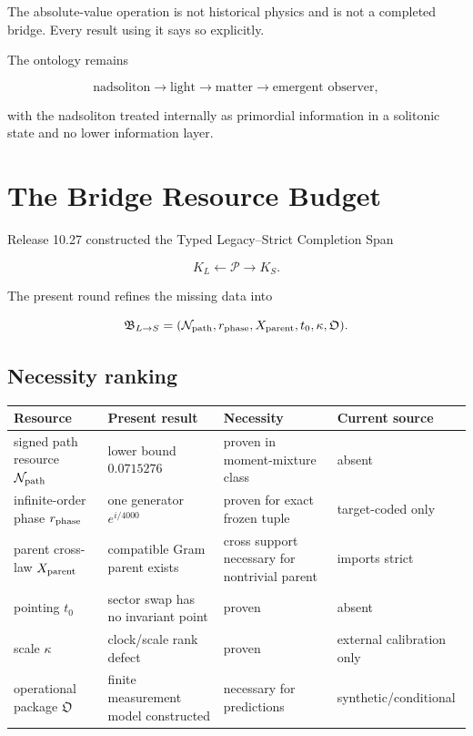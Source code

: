 \documentclass[11pt,a4paper,openany]{report}
\begin{document}
The absolute-value operation is not historical physics and is not a completed bridge. Every result using it says so explicitly.

The ontology remains

\[
\text{nadsoliton}
\to
\text{light}
\to
\text{matter}
\to
\text{emergent observer},
\]

with the nadsoliton treated internally as primordial information in a solitonic state and no lower information layer.

\chapter{The Bridge Resource Budget}

Release 10.27 constructed the Typed Legacy--Strict Completion Span

\[
K_L\leftarrow\mathcal P\rightarrow K_S.
\]

The present round refines the missing data into

\[
\mathfrak B_{L\to S}
=
(\mathcal N_{\rm path},
r_{\rm phase},
X_{\rm parent},
t_0,
\kappa,
\mathfrak O).
\]

\section{Necessity ranking}

\begin{center}
\begingroup\small
\setlength{\tabcolsep}{2.5pt}
\renewcommand{\arraystretch}{1.16}
\begin{longtable}{@{}p{}p{}p{}p{}@{}}
\toprule
\textbf{Resource} & \textbf{Present result} & \textbf{Necessity} & \textbf{Current source} \\
\midrule
\endhead
signed path resource \(\mathcal N_{\rm path}\) & lower bound \(0.0715276\) & proven in moment-mixture class & absent \\
infinite-order phase \(r_{\rm phase}\) & one generator \(e^{i/4000}\) & proven for exact frozen tuple & target-coded only \\
parent cross-law \(X_{\rm parent}\) & compatible Gram parent exists & cross support necessary for nontrivial parent & imports strict \\
pointing \(t_0\) & sector swap has no invariant point & proven & absent \\
scale \(\kappa\) & clock/\allowbreak{}scale rank defect & proven & external calibration only \\
operational package \(\mathfrak O\) & finite measurement model constructed & necessary for predictions & synthetic/\allowbreak{}conditional \\
\bottomrule
\end{longtable}
\endgroup
\end{center}
\end{document}

